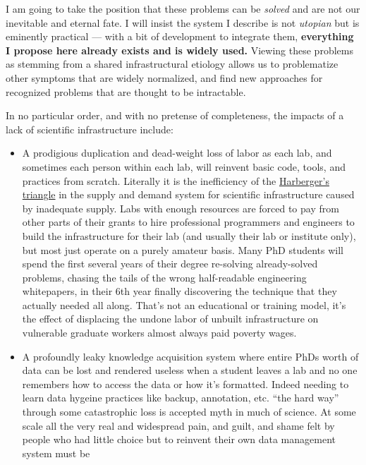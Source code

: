 \documentclass[nohyper]{tufte-book-jls}
\begin{document}
I am going to take the position that these problems can be \emph{solved}
and are not our inevitable and eternal fate. I will insist the system I
describe is not \emph{utopian} but is eminently practical --- with a bit
of development to integrate them, \textbf{everything I propose here
already exists and is widely used.} Viewing these problems as stemming
from a shared infrastructural etiology allows us to problematize other
symptoms that are widely normalized, and find new approaches for
recognized problems that are thought to be intractable.

In no particular order, and with no pretense of completeness, the
impacts of a lack of scientific infrastructure include:

\begin{itemize}

\item
  A prodigious duplication and dead-weight loss of labor as each lab,
  and sometimes each person within each lab, will reinvent basic code,
  tools, and practices from scratch. Literally it is the inefficiency of
  the
  \href{https://en.wikipedia.org/wiki/Deadweight_loss\#Harberger's_triangle}{Harberger's
  triangle} in the supply and demand system for scientific
  infrastructure caused by inadequate supply. Labs with enough resources
  are forced to pay from other parts of their grants to hire
  professional programmers and engineers to build the infrastructure for
  their lab (and usually their lab or institute only), but most just
  operate on a purely amateur basis. Many PhD students will spend the
  first several years of their degree re-solving already-solved
  problems, chasing the tails of the wrong half-readable engineering
  whitepapers, in their 6th year finally discovering the technique that
  they actually needed all along. That's not an educational or training
  model, it's the effect of displacing the undone labor of unbuilt
  infrastructure on vulnerable graduate workers almost always paid
  poverty wages.
\item
  A profoundly leaky knowledge acquisition system where entire PhDs
  worth of data can be lost and rendered useless when a student leaves a
  lab and no one remembers how to access the data or how it's formatted.
  Indeed needing to learn data hygeine practices like backup,
  annotation, etc. ``the hard way'' through some catastrophic loss is
  accepted myth in much of science. At some scale all the very real and
  widespread pain, and guilt, and shame felt by people who had little
  choice but to reinvent their own data management system must be

\end{itemize}
\end{document}
